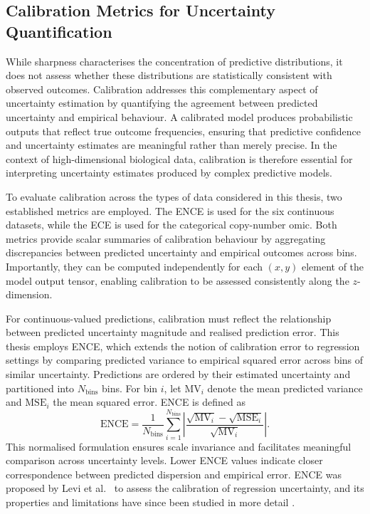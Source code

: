 \subsection{Calibration Metrics for Uncertainty Quantification} \label{Calibration}

While sharpness characterises the concentration of predictive distributions, it does not assess whether these distributions are statistically consistent with observed outcomes. Calibration addresses this complementary aspect of uncertainty estimation by quantifying the agreement between predicted uncertainty and empirical behaviour. A calibrated model produces probabilistic outputs that reflect true outcome frequencies, ensuring that predictive confidence and uncertainty estimates are meaningful rather than merely precise. In the context of high-dimensional biological data, calibration is therefore essential for interpreting uncertainty estimates produced by complex predictive models.

To evaluate calibration across the types of data considered in this thesis, two established metrics are employed. The \gls{ENCE} is used for the six continuous datasets, while the \gls{ECE} is used for the categorical copy-number omic. Both metrics provide scalar summaries of calibration behaviour by aggregating discrepancies between predicted uncertainty and empirical outcomes across bins. Importantly, they can be computed independently for each $(x,y)$ element of the model output tensor, enabling calibration to be assessed consistently along the $z$-dimension.

For continuous-valued predictions, calibration must reflect the relationship between predicted uncertainty magnitude and realised prediction error. This thesis employs ENCE, which extends the notion of calibration error to regression settings by comparing predicted variance to empirical squared error across bins of similar uncertainty. Predictions are ordered by their estimated uncertainty and partitioned into $N_{\text{bins}}$ bins. For bin $i$, let $\mathrm{MV}_i$ denote the mean predicted variance and $\mathrm{MSE}_i$ the mean squared error. ENCE is defined as
\begin{equation}
\mathrm{ENCE} = \frac{1}{N_{\text{bins}}} \sum_{i=1}^{N_{\text{bins}}} 
\left| \frac{\sqrt{\mathrm{MV}_i} - \sqrt{\mathrm{MSE}_i}}{\sqrt{\mathrm{MV}_i}} \right|.
\end{equation}
This normalised formulation ensures scale invariance and facilitates meaningful comparison across uncertainty levels. Lower ENCE values indicate closer correspondence between predicted dispersion and empirical error. ENCE was proposed by Levi et al.\ \citep{Levi2022RegressionCalibration} to assess the calibration of regression uncertainty, and its properties and limitations have since been studied in more detail \citep{Pernot2023ENCE}.

